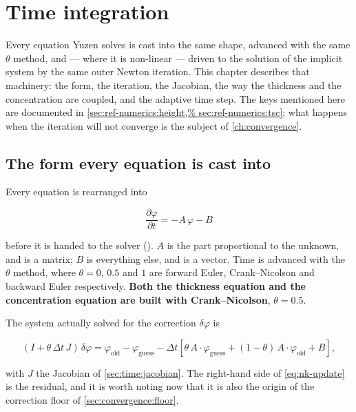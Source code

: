 \chapter{Time integration}
\label{ch:timeintegration}

Every equation Yuzen solves is cast into the same shape, advanced with the same
$\theta$ method, and --- where it is non-linear --- driven to the solution of
the implicit system by the same outer Newton iteration. This chapter describes
that machinery: the form, the iteration, the Jacobian, the way the thickness
and the concentration are coupled, and the adaptive time step. The keys
mentioned here are documented in \cref{sec:ref-numerics:height,%
sec:ref-numerics:tsc}; what happens when the iteration will not converge is the
subject of \cref{ch:convergence}.

\section{The form every equation is cast into}
\label{sec:time:form}

Every equation is rearranged into

\[
  \frac{\partial\varphi}{\partial t} = -A\,\varphi - B
\]

before it is handed to the solver (). $A$ is
the part proportional to the unknown, and is a matrix; $B$ is everything else,
and is a vector. Time is advanced with the $\theta$ method, where
$\theta = 0$, $0.5$ and $1$ are forward Euler, Crank--Nicolson and backward
Euler respectively. \textbf{Both the thickness equation and the concentration
equation are built with Crank--Nicolson}, $\theta = 0.5$.

The system actually solved for the correction $\delta\varphi$ is

\begin{equation}\label{eq:nk-update}
  (I + \theta\,\Delta t\,J)\,\delta\varphi
    = \varphi_{\mathrm{old}} - \varphi_{\mathrm{guess}}
      - \Delta t\left[\theta\,A\cdot\varphi_{\mathrm{guess}}
        + (1-\theta)\,A\cdot\varphi_{\mathrm{old}} + B\right],
\end{equation}

with $J$ the Jacobian of \cref{sec:time:jacobian}. The right-hand side of
\cref{eq:nk-update} is the residual, and it is worth noting now that it is
also the origin of the correction floor of \cref{sec:convergence:floor}.

